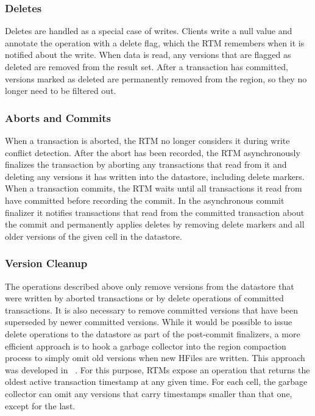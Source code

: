\documentclass[10pt,final,journal]{IEEEtran}
\begin{document}
\subsubsection{Deletes}
Deletes are handled as a special case of writes. Clients write a null value and annotate the operation with a delete flag, which the RTM remembers when it is notified about the write. When data is read, any versions that are flagged as deleted are removed from the result set. After a transaction has committed, versions marked as deleted are permanently removed from the region, so they no longer need to be filtered out.

\subsubsection{Aborts and Commits}
When a transaction is aborted, the RTM no longer considers it during write conflict detection. After the abort has been recorded, the RTM asynchronously finalizes the transaction by aborting any transactions that read from it and deleting any versions it has written into the datastore, including delete markers. When a transaction commits, the RTM waits until all transactions it read from have committed before recording the commit. In the asynchronous commit finalizer it notifies transactions that read from the committed transaction about the commit and permanently applies deletes by removing delete markers and all older versions of the given cell in the datastore.

\subsubsection{Version Cleanup}
The operations described above only remove versions from the datastore that were written by aborted transactions or by delete operations of committed transactions. It is also necessary to remove committed versions that have been superseded by newer committed versions. While it would be possible to issue delete operations to the datastore as part of the post-commit finalizers, a more efficient approach is to hook a garbage collector into the region compaction process to simply omit old versions when new HFiles are written. This approach was developed in ~\cite{Junqueira:2011:LTS:2056318.2057148}. For this purpose, RTMs expose an operation that returns the oldest active transaction timestamp at any given time. For each cell, the garbage collector can omit any versions that carry timestamps smaller than that one, except for the last.
\end{document}
